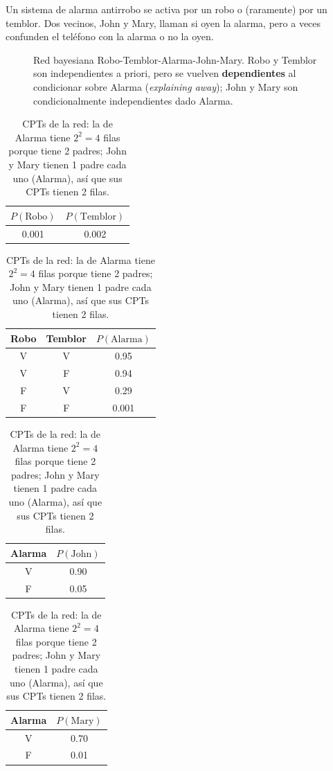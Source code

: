 \begin{example}
    Un sistema de alarma antirrobo se activa por un robo o (raramente) por un temblor. Dos vecinos, John y Mary,
    llaman si oyen la alarma, pero a veces confunden el teléfono con la alarma o no la oyen.
\end{example}

\begin{figure}[H]
\centering
{}
\caption{Red bayesiana Robo-Temblor-Alarma-John-Mary. Robo y Temblor son independientes a priori, pero se vuelven
\textbf{dependientes} al condicionar sobre Alarma (\textit{explaining away}); John y Mary son condicionalmente
independientes dado Alarma.}
\end{figure}

\begin{table}[H]
    \centering
    \begin{tabular}{cc}
        \toprule
        $P(\text{Robo})$ & $P(\text{Temblor})$ \\
        \midrule
        0.001 & 0.002 \\
        \bottomrule
    \end{tabular}
    \qquad
    \begin{tabular}{ccc}
        \toprule
        Robo & Temblor & $P(\text{Alarma})$ \\
        \midrule
        V & V & 0.95 \\
        V & F & 0.94 \\
        F & V & 0.29 \\
        F & F & 0.001 \\
        \bottomrule
    \end{tabular}
    \qquad
    \begin{tabular}{cc}
        \toprule
        Alarma & $P(\text{John})$ \\
        \midrule
        V & 0.90 \\
        F & 0.05 \\
        \bottomrule
    \end{tabular}
    \qquad
    \begin{tabular}{cc}
        \toprule
        Alarma & $P(\text{Mary})$ \\
        \midrule
        V & 0.70 \\
        F & 0.01 \\
        \bottomrule
    \end{tabular}
    \caption{CPTs de la red: la de Alarma tiene $2^2=4$ filas porque tiene 2 padres; John y Mary tienen 1 padre cada
    uno (Alarma), así que sus CPTs tienen 2 filas.}
\end{table}
